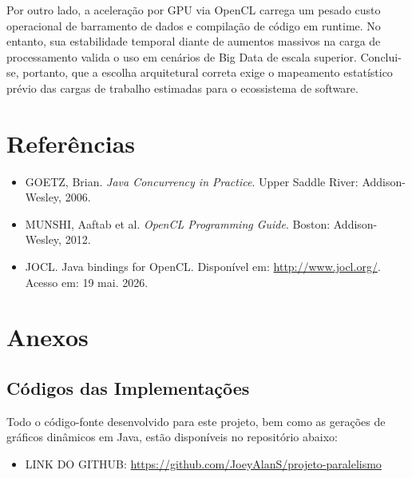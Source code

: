 \documentclass[11pt,a4paper]{article}
\begin{document}
Por outro lado, a aceleração por GPU via OpenCL carrega um pesado custo operacional de barramento de dados e compilação de código em runtime. No entanto, sua estabilidade temporal diante de aumentos massivos na carga de processamento valida o uso em cenários de Big Data de escala superior. Conclui-se, portanto, que a escolha arquitetural correta exige o mapeamento estatístico prévio das cargas de trabalho estimadas para o ecossistema de software.

\section{Referências}
\begin{itemize}
	\item GOETZ, Brian. \textit{Java Concurrency in Practice}. Upper Saddle River: Addison-Wesley, 2006.
	\item MUNSHI, Aaftab et al. \textit{OpenCL Programming Guide}. Boston: Addison-Wesley, 2012.
	\item JOCL. Java bindings for OpenCL. Disponível em: \url{http://www.jocl.org/}. Acesso em: 19 mai. 2026.
\end{itemize}

\section{Anexos}
\subsection{Códigos das Implementações}
Todo o código-fonte desenvolvido para este projeto, bem como as gerações de gráficos dinâmicos em Java, estão disponíveis no repositório abaixo:

\begin{itemize}
	\item LINK DO GITHUB: \url{https://github.com/JoeyAlanS/projeto-paralelismo}
\end{itemize}
\end{document}
